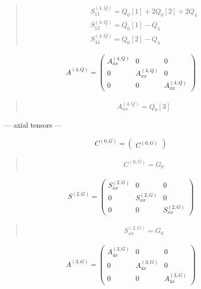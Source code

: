 \documentclass[fleqn,10pt]{jsarticle}
\begin{document}
\begin{quote}
\begin{align*}
& S^{(4,Q)}_{11} = Q_{0}[1] + 2 Q_{0}[2] + 2 Q_{4} \\
& S^{(4,Q)}_{12} = Q_{0}[1] - Q_{4} \\
& S^{(4,Q)}_{44} = Q_{0}[2] - Q_{4}
\end{align*}
\end{quote}
\begin{align*}
A^{(4,Q)} = \begin{pmatrix} A^{(4,Q)}_{xx} & 0 & 0 \\ 0 & A^{(4,Q)}_{xx} & 0 \\ 0 & 0 & A^{(4,Q)}_{xx} \end{pmatrix}
\end{align*}
\begin{quote}
\begin{align*}
& A^{(4,Q)}_{xx} = Q_{0}[3]
\end{align*}
\end{quote}
\newpage
\begin{center}\LARGE --- axial tensors ---\end{center}
\begin{align*}
C^{(0,G)} = \begin{pmatrix} C^{(0,G)} \end{pmatrix}
\end{align*}
\begin{quote}
\begin{align*}
& C^{(0,G)} = G_{0}
\end{align*}
\end{quote}
\begin{align*}
S^{(2,G)} = \begin{pmatrix} S^{(2,G)}_{xx} & 0 & 0 \\ 0 & S^{(2,G)}_{xx} & 0 \\ 0 & 0 & S^{(2,G)}_{xx} \end{pmatrix}
\end{align*}
\begin{quote}
\begin{align*}
& S^{(2,G)}_{xx} = G_{0}
\end{align*}
\end{quote}
\begin{align*}
A^{(3,G)} = \begin{pmatrix} A^{(3,G)}_{4x} & 0 & 0 \\ 0 & A^{(3,G)}_{4x} & 0 \\ 0 & 0 & A^{(3,G)}_{4x} \end{pmatrix}
\end{align*}
\end{document}
